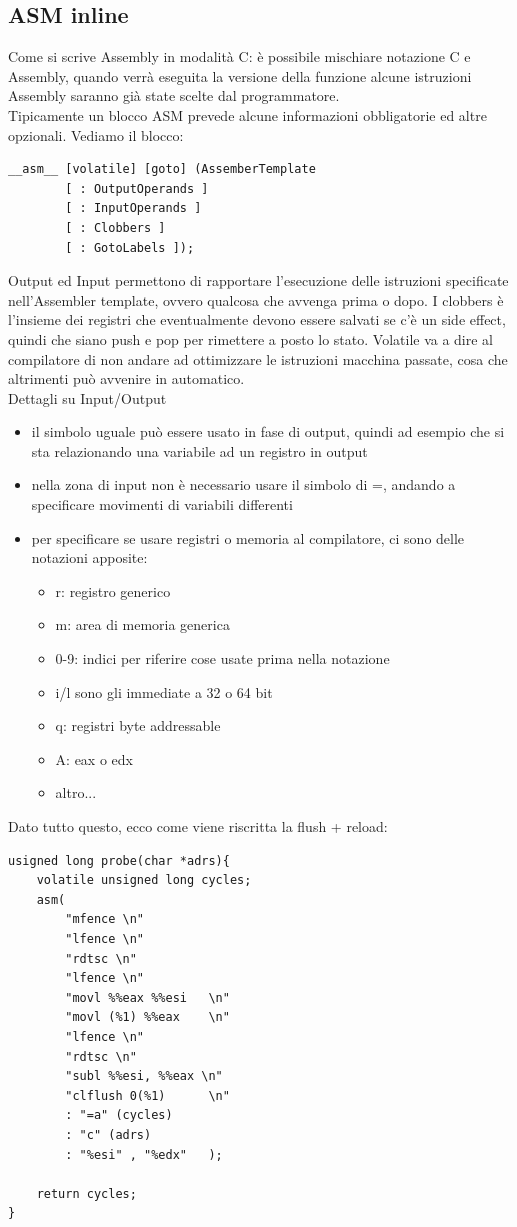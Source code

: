 \documentclass[14pt, oneside]{book}
\begin{document}
\subsection{ASM inline}
Come si scrive Assembly in modalità C: è possibile mischiare notazione C e Assembly, quando verrà eseguita la versione della funzione alcune istruzioni Assembly saranno già state scelte dal programmatore.\\ Tipicamente un blocco ASM prevede alcune informazioni obbligatorie ed altre opzionali. Vediamo il blocco:
\begin{lstlisting}
__asm__ [volatile] [goto] (AssemberTemplate
		[ : OutputOperands ]
		[ : InputOperands ]
		[ : Clobbers ]
		[ : GotoLabels ]);
\end{lstlisting}
Output ed Input permettono di rapportare l'esecuzione delle istruzioni specificate nell'Assembler template, ovvero qualcosa che avvenga prima o dopo. I clobbers è l'insieme dei registri che eventualmente devono essere salvati se c'è un side effect, quindi che siano push e pop per rimettere a posto lo stato. Volatile va a dire al compilatore di non andare ad ottimizzare le istruzioni macchina passate, cosa che altrimenti può avvenire in automatico.\\ Dettagli su Input/Output
\begin{itemize}
\item il simbolo uguale può essere usato in fase di output, quindi ad esempio che si sta relazionando una variabile ad un registro in output
\item nella zona di input non è necessario usare il simbolo di =, andando a specificare movimenti di variabili differenti
\item per specificare se usare registri o memoria al compilatore, ci sono delle notazioni apposite:
\begin{itemize}
\item r: registro generico
\item m: area di memoria generica
\item 0-9: indici per riferire cose usate prima nella notazione
\item i/l sono gli immediate a 32 o 64 bit
\item q: registri byte addressable
\item A: eax o edx
\item altro...
\end{itemize}
\end{itemize}
Dato tutto questo, ecco come viene riscritta la flush + reload:
\begin{lstlisting}
usigned long probe(char *adrs){
	volatile unsigned long cycles;
	asm(
		"mfence \n"
		"lfence \n"
		"rdtsc \n"
		"lfence \n"
		"movl %%eax %%esi	\n"
		"movl (%1) %%eax	\n"
		"lfence \n"
		"rdtsc \n"
		"subl %%esi, %%eax \n"
		"clflush 0(%1)		\n"
		: "=a" (cycles)
		: "c" (adrs)
		: "%esi" , "%edx"   );
	
	return cycles;
}
\end{lstlisting}
\end{document}
